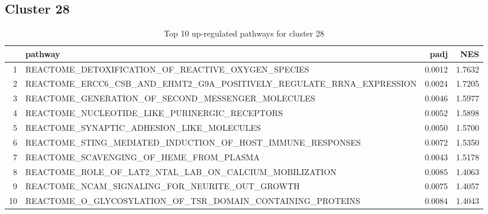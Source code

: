 \documentclass{article}
\begin{document}
\subsection{Cluster 28 }
\begin{table}[H]
\centering
\begin{tabularx}{\textwidth}{rlrr}
  \hline
 & pathway & padj & NES \\ 
  \hline
1 & REACTOME\_DETOXIFICATION\_OF\_REACTIVE\_OXYGEN\_SPECIES & 0.0012 & 1.7632 \\ 
  2 & REACTOME\_ERCC6\_CSB\_AND\_EHMT2\_G9A\_POSITIVELY\_REGULATE\_RRNA\_EXPRESSION & 0.0024 & 1.7205 \\ 
  3 & REACTOME\_GENERATION\_OF\_SECOND\_MESSENGER\_MOLECULES & 0.0046 & 1.5977 \\ 
  4 & REACTOME\_NUCLEOTIDE\_LIKE\_PURINERGIC\_RECEPTORS & 0.0052 & 1.5898 \\ 
  5 & REACTOME\_SYNAPTIC\_ADHESION\_LIKE\_MOLECULES & 0.0050 & 1.5700 \\ 
  6 & REACTOME\_STING\_MEDIATED\_INDUCTION\_OF\_HOST\_IMMUNE\_RESPONSES & 0.0072 & 1.5350 \\ 
  7 & REACTOME\_SCAVENGING\_OF\_HEME\_FROM\_PLASMA & 0.0043 & 1.5178 \\ 
  8 & REACTOME\_ROLE\_OF\_LAT2\_NTAL\_LAB\_ON\_CALCIUM\_MOBILIZATION & 0.0085 & 1.4063 \\ 
  9 & REACTOME\_NCAM\_SIGNALING\_FOR\_NEURITE\_OUT\_GROWTH & 0.0075 & 1.4057 \\ 
  10 & REACTOME\_O\_GLYCOSYLATION\_OF\_TSR\_DOMAIN\_CONTAINING\_PROTEINS & 0.0084 & 1.4043 \\ 
   \hline
\end{tabularx}
\caption{Top 10 up-regulated pathways for cluster 28} 
\label{tab:q3_2_28}
\end{table}
\end{document}
